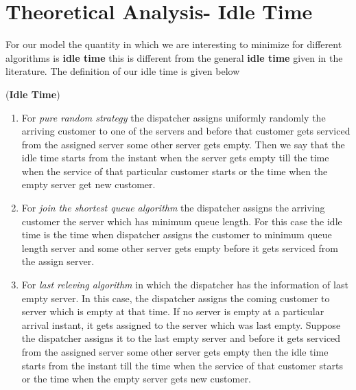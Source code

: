 \documentclass[a4paper,english,11pt]{article}
\begin{document}
\section{Theoretical Analysis- Idle Time}
For our model the quantity in which we are interesting to minimize for different algorithms is \textbf{idle time} this is different from the general \textbf{idle time} given in the literature. The definition of our idle time is given below  
\begin{defn}(\textbf{Idle Time})
\begin{enumerate}
\item For \textit{pure random strategy} the dispatcher assigns uniformly randomly the arriving customer to one of the servers and before that customer gets serviced from the assigned server some other server gets empty. Then we say that the idle time starts from the instant when the server gets empty till the time when the service of that particular customer starts or the time when the empty server get new customer.
\item For \textit{join the shortest queue algorithm} the dispatcher assigns the arriving  customer the server which has minimum queue length. For this case the idle time is the time when dispatcher assigns the customer to minimum queue length server and some other server gets empty before it gets serviced from the assign server. 
\item For \textit{last releving algorithm} in which the dispatcher has the information of last empty server. In this case, the dispatcher assigns the coming customer to server which is empty at that time. If no server is empty at a particular arrival instant,  it gets assigned to the server which was last empty. Suppose the dispatcher assigns it to the last empty server and before it gets serviced from the assigned server some other server gets empty then the idle time starts from the instant till the time when the service of that customer starts or the time when the empty server gets new customer.
\end{enumerate}
\end{defn}
\end{document}
